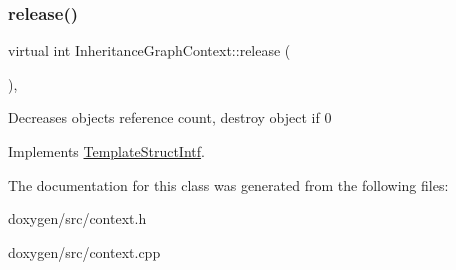 \mbox{\label{class_inheritance_graph_context_ac793f53cb0f72b1b9e2f6920c2667c61}} 
\subsubsection{\texorpdfstring{release()}{release()}}
{\footnotesize\ttfamily virtual int Inheritance\+Graph\+Context\+::release (\begin{DoxyParamCaption}{ }\end{DoxyParamCaption})\hspace{0.3cm}{\ttfamily [inline]}, {\ttfamily [virtual]}}

Decreases object\textquotesingle{}s reference count, destroy object if 0 

Implements \mbox{\hyperlink{class_template_struct_intf_a3dce7dd29d3f66a8080b40578e8a5045}{Template\+Struct\+Intf}}.



The documentation for this class was generated from the following files\+:\begin{DoxyCompactItemize}
\item 
doxygen/src/context.\+h\item 
doxygen/src/context.\+cpp\end{DoxyCompactItemize}
